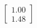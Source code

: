 \documentclass[preview]{standalone}
\begin{document}
\begin{align*}
\begin{bmatrix} 1.00 \\ 1.48 \end{bmatrix}
\end{align*}
\end{document}
